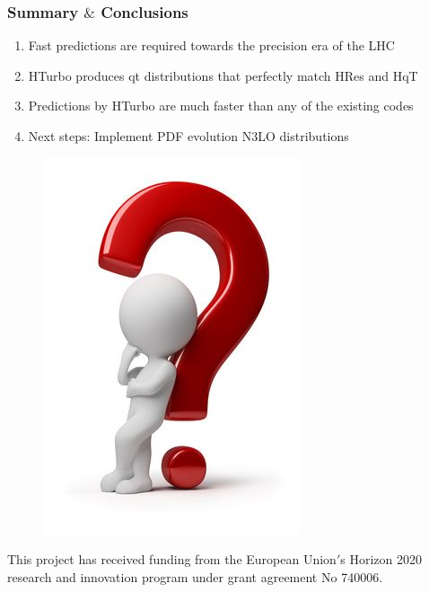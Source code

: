\documentclass[aspectratio=43]{beamer}
\begin{document}
\begin{frame}
	
	\frametitle{Summary $\&$ Conclusions}

	\vspace{2.0 cm}
	
	\begin{enumerate}
		\item Fast predictions are required towards the precision era of the LHC
		\item HTurbo produces qt distributions that perfectly match HRes and HqT
		\item Predictions by HTurbo are much faster than any of the existing codes
		\item Next steps: Implement PDF evolution N3LO distributions

	\end{enumerate}

	\vspace{2.0 cm}

\end{frame}

\begin{frame}


	\begin{figure}
		\includegraphics[width = 4 cm]{plots/thinking.png}
	\end{figure}		


{\small \color{blue} This project has received funding from the European Union$'$s Horizon 2020 research and innovation program under grant agreement No 740006.}

\end{frame}
\end{document}
